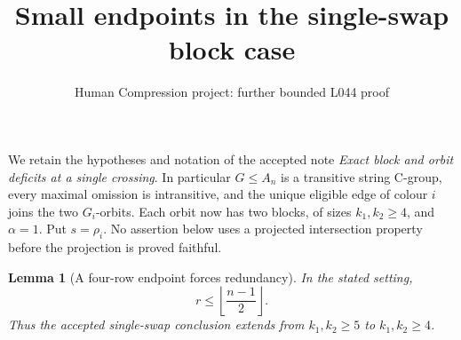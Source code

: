 \documentclass[11pt,a4paper]{article}
\title{Small endpoints in the single-swap block case}
\author{Human Compression project: further bounded L044 proof}
\date{}
\newtheorem{lemma}{Lemma}
\begin{document}
\maketitle
We retain the hypotheses and notation of the accepted note
\emph{Exact block and orbit deficits at a single crossing}.
In particular $G\leq A_n$ is a transitive string C-group, every
maximal omission is intransitive, and the unique eligible edge
of colour $i$ joins the two $G_i$-orbits. Each orbit now has
two blocks, of sizes $k_1,k_2\geq4$, and $\alpha=1$.
Put $s=\rho_i$. No assertion below uses a projected intersection
property before the projection is proved faithful.

\begin{lemma}[A four-row endpoint forces redundancy]\label{four}
In the stated setting,
\[
 r\leq\left\lfloor\frac{n-1}{2}\right\rfloor.
\]
Thus the accepted single-swap conclusion extends from
$k_1,k_2\geq5$ to $k_1,k_2\geq4$.
\end{lemma}
\end{document}
